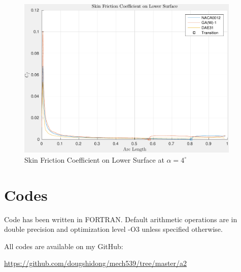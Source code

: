 \documentclass[letterpaper,12pt,]{article}
\begin{document}
\begin{figure}[!h]
    \centering
    \includegraphics[width = 0.95\textwidth]{./figures/q4lowercf.pdf}
    \caption{Skin Friction Coefficient on Lower Surface at $\alpha = 4^\circ$}
    \label{fig:q4dlower}
\end{figure}

\section*{Codes}

Code has been written in FORTRAN. Default arithmetic operations are in double precision and optimization level -O3 unless specified otherwise.

All codes are available on my GitHub:

\url{https://github.com/dougshidong/mech539/tree/master/a2}
\end{document}

